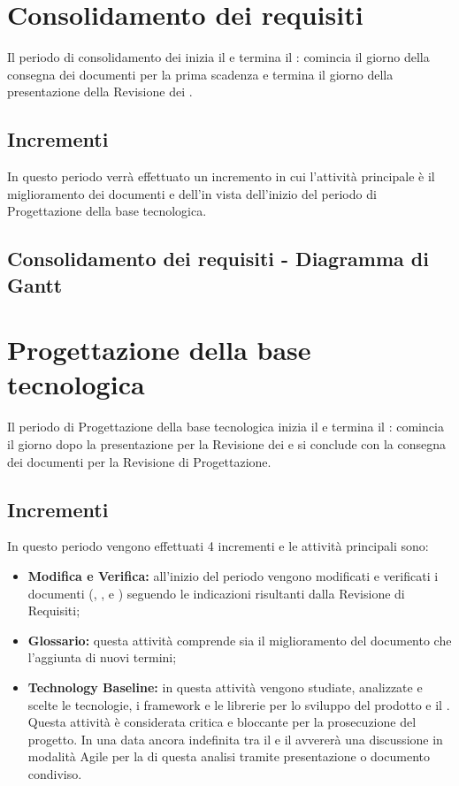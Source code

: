 \documentclass[PianoDiProgetto.tex]{subfiles}
\begin{document}
\section{Consolidamento dei requisiti}
Il periodo di consolidamento dei  inizia il  e termina il : comincia il giorno della consegna dei documenti per la prima scadenza e termina il giorno della presentazione della Revisione dei .

\subsection{Incrementi}
 In questo periodo verrà effettuato un incremento in cui l'attività principale è il miglioramento dei documenti e dell'\adr in vista dell'inizio del periodo di Progettazione della base tecnologica.
\subsection{Consolidamento dei requisiti - Diagramma di Gantt}

\newpage

\section{Progettazione della base tecnologica}
Il periodo di Progettazione della base tecnologica inizia il  e termina il : comincia il giorno dopo la presentazione per la Revisione dei  e si conclude con la consegna dei documenti per la Revisione di Progettazione.

\subsection{Incrementi}
In questo periodo vengono effettuati 4 incrementi e le attività principali sono:

\begin{itemize}
	\item \textbf{Modifica e Verifica:} all'inizio del periodo vengono modificati e verificati i documenti (\ndp, \pdp, \pdq e \adr) seguendo le indicazioni risultanti dalla Revisione di Requisiti;
	\item \textbf{Glossario:} questa attività comprende sia il miglioramento del documento \g che l'aggiunta di nuovi termini;
	\item \textbf{Technology Baseline:} 
	in questa attività vengono studiate, analizzate e scelte le tecnologie, i framework e le librerie per lo sviluppo del prodotto e il . Questa attività è considerata critica e bloccante per la prosecuzione del progetto. In una data ancora indefinita tra il  e il  avvererà una discussione in modalità Agile per la  di questa analisi tramite presentazione o documento condiviso.
\end{itemize}
\end{document}
